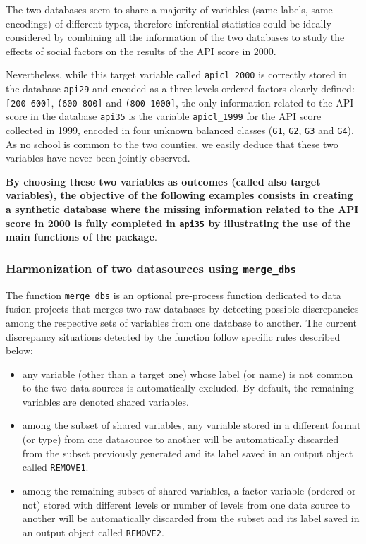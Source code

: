The two databases seem to share a majority of variables (same labels, same encodings) of different types, therefore inferential statistics could be ideally considered by combining all the information of the two databases to study the effects of social factors on the results of the API score in 2000.

Nevertheless, while this target variable called \texttt{apicl\_2000} is correctly stored in the database \texttt{api29} and encoded as a three levels ordered factors clearly defined: \texttt{{[}200-600{]}}, \texttt{(600-800{]}} and \texttt{(800-1000{]}}, the only information related to the API score in the database \texttt{api35} is the variable \texttt{apicl\_1999} for the API score collected in 1999, encoded in four unknown balanced classes (\texttt{G1}, \texttt{G2}, \texttt{G3} and \texttt{G4}). As no school is common to the two counties, we easily deduce that these two variables have never been jointly observed.

\textbf{By choosing these two variables as outcomes (called also target variables), the objective of the following examples consists in creating a synthetic database where the missing information related to the API score in 2000 is fully completed in \texttt{api35} by illustrating the use of the main functions of the package}.

\hypertarget{harmonization-of-two-datasources-using-merge_dbs}{%
\subsubsection{\texorpdfstring{Harmonization of two datasources using \texttt{merge\_dbs}}{Harmonization of two datasources using merge\_dbs}}\label{harmonization-of-two-datasources-using-merge_dbs}}

The function \texttt{merge\_dbs} is an optional pre-process function dedicated to data fusion projects that merges two
raw databases by detecting possible discrepancies among the respective sets of variables from one database to
another. The current discrepancy situations detected by the function follow specific rules described below:

\begin{itemize}
\tightlist
\item
  any variable (other than a target one) whose label (or name) is not common to the two data sources is automatically excluded. By default, the remaining variables are denoted shared variables.
\item
  among the subset of shared variables, any variable stored in a different format (or type) from one datasource to another will be automatically discarded from the subset previously generated and its label saved in an output object called \texttt{REMOVE1}.
\item
  among the remaining subset of shared variables, a factor variable (ordered or not) stored with different levels or number of levels from one data source to another will be automatically discarded from the subset and its label saved in an output object called \texttt{REMOVE2}.
\end{itemize}

